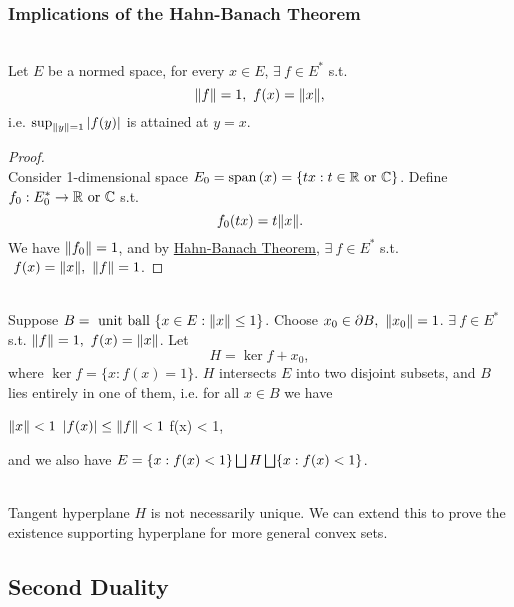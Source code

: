 \subsubsection{Implications of the Hahn-Banach Theorem}
\begin{proposition}\label{SHT}\ \\
Let $E$ be a normed space, for every $x \in E$, $\exists\ f \in E^*$ s.t. 
\begin{equation*}
    \norm{f} = 1,\ f(x) = \norm{x},
\end{equation*}
i.e. $\sup_{\norm{y}=1} \abs{f(y)}$ is attained at $y = x$. 
\end{proposition}
\begin{proof}\ \\
Consider 1-dimensional space $E_0 = \operatorname{span}\left(x\right) = \{tx: t \in \mathbb{R} \text{ or } \mathbb{C}\}$. Define $f_0: E_0^* \to \mathbb{R} \text{ or } \mathbb{C}$ s.t.
\begin{equation*}
    f_0(tx) = t \norm{x}.
\end{equation*}
We have $\norm{f_0} = 1$, and by \hyperref[HB thm]{Hahn-Banach Theorem}, $\exists\ f \in E^*$ s.t. $\ f(x) = \norm{x},\ \norm{f} = 1$.
\end{proof}
\begin{remark}\ \\
Suppose $B = \text{ unit ball } \{x \in E: \norm{x} \leq 1\}$. Choose $x_0 \in \partial B,\ \norm{x_0} = 1$. $\exists\ f \in E^*$ s.t. $\norm{f} = 1,\ f(x) = \norm{x}$. Let 
\begin{equation*}
    H = \ker{f} + x_0,
\end{equation*}
where $\ker{f} = \{x: f(x) = 1\}$. $H$ intersects $E$ into two disjoint subsets, and $B$ lies entirely in one of them, i.e. for all $x \in B$ we have
\begin{center}
    $\norm{x} < 1$ \imply $\abs{f(x)} \leq \norm{f} < 1$ \imply f(x) < 1,
\end{center}
and we also have $E = \{x: f(x) < 1\} \bigsqcup H \bigsqcup \{x: f(x) < 1\}$.
\end{remark}
\begin{remark}\ \\
Tangent hyperplane $H$ is not necessarily unique. We can extend this to prove the existence supporting hyperplane for more general convex sets.
\end{remark}

\vspace{12pt}
\subsection{Second Duality}

